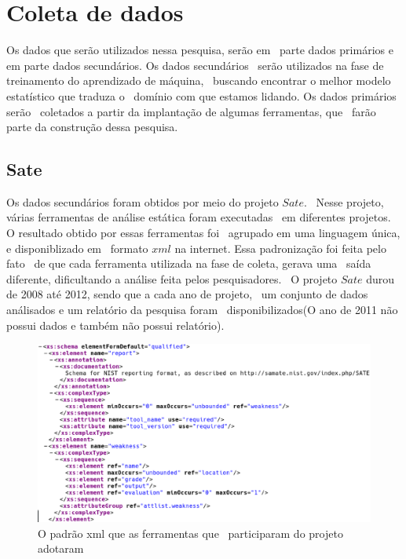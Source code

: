 
\section{Coleta de dados}
Os dados que serão utilizados nessa pesquisa, serão em \ 
parte dados primários e em parte dados secundários. Os dados secundários \ 
serão utilizados na fase de treinamento do aprendizado de máquina, \ 
buscando encontrar o melhor modelo estatístico que traduza o \ 
domínio com que estamos lidando. Os dados primários serão \ 
coletados a partir da implantação de algumas ferramentas, que \ 
farão parte da construção dessa pesquisa.

\subsection{Sate}
Os dados secundários foram obtidos por meio do projeto $Sate$. \ 
Nesse projeto, várias ferramentas de análise estática foram executadas \ 
em diferentes projetos. O resultado obtido por essas ferramentas foi \ 
agrupado em uma linguagem única, e disponiblizado em \ 
formato $xml$ na internet. Essa padronização foi feita pelo fato \ 
de que cada ferramenta utilizada na fase de coleta, gerava uma \ 
saída diferente, dificultando a análise feita pelos pesquisadores. \ 
O projeto $Sate$ durou de 2008 até 2012, sendo que a cada ano de projeto, \ 
um conjunto de dados análisados e um relatório da pesquisa foram \ 
disponibilizados(O ano de 2011 não possui dados e também não possui relatório).

\newpage
\begin{figure}[h]
	\centering
	\label{sate_schema}
        \includegraphics[scale=0.42]{figuras/sate_schema.eps}
	\caption{O padrão xml que as ferramentas que \
        participaram do projeto adotaram}
\end{figure}

